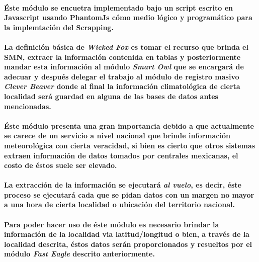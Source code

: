     \paragraph{Éste módulo se encuetra implementado bajo un script escrito en Javascript usando PhantomJs cómo medio lógico y programático para la implemtación del Scrapping.}
    \paragraph{ La definición básica de \textbf{\emph{Wicked Fox}} es tomar el recurso que brinda el SMN, extraer la información contenida en tablas y posteriormente mandar esta información al módulo \textbf{\emph{Smart Owl}} que se encargará de adecuar y después delegar el trabajo al módulo de registro masivo \textbf{\emph{Clever Beaver}} donde al final la información climatológica de cierta localidad será guardad en alguna de las bases de datos antes mencionadas.}
    \paragraph{Éste módulo presenta una gran importancia debido a que actualmente se carece de un servicio a nivel nacional que brinde información meteorológica con cierta veracidad, si bien es cierto que otros sistemas extraen información de datos tomados por centrales mexicanas, el costo de éstos suele ser elevado.}
    \paragraph{La extracción de la información se ejecutará \emph{al vuelo}, es decir, éste proceso se ejecutará cada que se pidan datos con un margen no mayor a una hora de cierta localidad o ubicación del territorio nacional.}
    \paragraph{Para poder hacer uso de éste módulo es necesario brindar la información de la localidad via latitud/longitud o bien, a través de la localidad descrita, éstos datos serán proporcionados y resueltos por el módulo \textbf{\emph{Fast Eagle}} descrito anteriormente.}
      